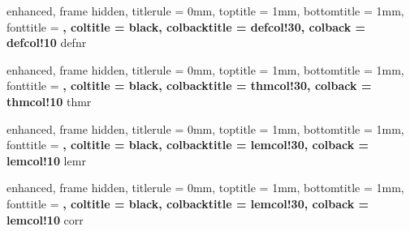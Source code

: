 
{
    enhanced,
    frame hidden,
    titlerule = 0mm,
    toptitle = 1mm,
    bottomtitle = 1mm,
    fonttitle = \bfseries\large,
    coltitle = black,
    colbacktitle = defcol!30,
    colback = defcol!10
}{defnr}



{
    enhanced,
    frame hidden,
    titlerule = 0mm,
    toptitle = 1mm,
    bottomtitle = 1mm,
    fonttitle = \bfseries\large,
    coltitle = black,
    colbacktitle = thmcol!30,
    colback = thmcol!10
}{thmr}



{
    enhanced,
    frame hidden,
    titlerule = 0mm,
    toptitle = 1mm,
    bottomtitle = 1mm,
    fonttitle = \bfseries\large,
    coltitle = black,
    colbacktitle = lemcol!30,
    colback = lemcol!10
}{lemr}



{
    enhanced,
    frame hidden,
    titlerule = 0mm,
    toptitle = 1mm,
    bottomtitle = 1mm,
    fonttitle = \bfseries\large,
    coltitle = black,
    colbacktitle = lemcol!30,
    colback = lemcol!10
}{corr}

